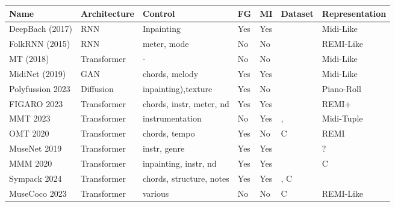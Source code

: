 \begin{table}[H]
\label{table:bigtable}
    \centering
    \begin{tabular}{|l|l|l|l|l|l|l|}
        \hline
        \textbf{Name} & \textbf{Architecture} & \textbf{Control} & \textbf{FG} & \textbf{MI} & \textbf{Dataset} & \textbf{Representation} \\
        \hline
        DeepBach (2017) \cite{Hadjeres_Pachet_Nielsen_2017} & RNN & Inpainting & Yes & Yes & \cite{jsbchorales} & Midi-Like\\ 
        FolkRNN (2015) \cite{Sturm_Ben-Tal_2016} & RNN & meter, mode & No & No & \cite{sessionfolkdata} & REMI-Like\\
        MT (2018) \cite{Huang_Vaswani_Uszkoreit_Shazeer_Simon_Hawthorne_Dai_Hoffman_Dinculescu_Eck_2018} & Transformer & - & No & No & \cite{hawthorne2018maestro} \cite{jsbchorales} & Midi-Like\\
        MidiNet (2019) \cite{midinet} & GAN & chords, melody & Yes & Yes & \cite{hooktheorypopmidi} & Midi-Like\\
        Polyfussion 2023 \cite{Min_Jiang_Xia_Zhao_polyffusion_2023} & Diffusion &inpainting),texture & Yes & No & \cite{Wang_Chen_pop90_dataset} & Piano-Roll\\
        FIGARO 2023 \cite{Rütte_figaro_2023} & Transformer & chords, instr, meter, nd & Yes & Yes & \cite{Raffel_2016} & REMI+ \\
        MMT 2023 \cite{Dong_Chen_MMT_Kirkpatrick_2023} & Transformer & instrumentation & No & Yes & \cite{Raffel_2016},\cite{Crestel_OrchestralDataset} & Midi-Tuple \\
        OMT 2020 \cite{Huang_Yang_remi_pop_transformer_2020} & Transformer & chords, tempo & Yes & No & C & REMI\\
        MuseNet 2019 \cite{Christine_2019} & Transformer & instr, genre & Yes & Yes & \cite{hawthorne2018maestro}\cite{classicalarchives}\cite{bitmidi} & ?\\
        MMM 2020 \cite{Ens_Pasquier_2020_MMM} & Transformer & inpainting, instr, nd & Yes & Yes & \cite{Raffel_2016} & C\\
        Sympack 2024 \cite{Chen_Smith_Spijkervet_Wang_Zou_Li_Kong_Du_2024} & Transformer & chords, structure, notes& Yes & Yes & \cite{Raffel_2016} \cite{Bertin-Mahieux_Ellis_Whitman_Lamere_2011}, C &  \\
        MuseCoco 2023 \cite{Lu_Xu_Kang_Yu_Xing_Tan_Bian_MuseCoco_2023} & Transformer & various & No & No & C & REMI-Like\\

\end{tabular}
\end{table}
